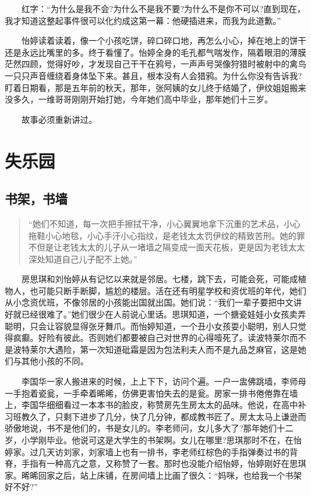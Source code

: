 \documentclass[12pt,UTF8]{ctexbook}
\begin{document}
　　红字：\enquote{为什么是我不会?为什么不是我不要?为什么不是你不可以?直到现在，我才知道这整起事件很可以化约成这第一幕：他硬插进来，而我为此道歉。}

　　怡婷读着读着，像一个小孩吃饼，碎口碎口地，再怎么小心，掉在地上的饼干还是永远比嘴里的多。终于看懂了。怡婷全身的毛孔都气喘发作，隔着眼泪的薄膜茫然四顾，觉得好吵，才发现自己干干在鸦号，一声声号哭像狩猎时被射中的禽鸟一只只声音缠绕着身体坠下来。甚且，根本没有人会猎鸦。为什么你没有告诉我?盯着日期看，那是五年前的秋天，那年，张阿姨的女儿终于结婚了，伊纹姐姐搬来没多久，一维哥哥刚刚开始打她，今年她们高中毕业，那年她们十三岁。

　　故事必须重新讲过。

\hypertarget{shileyuan}{%
\chapter{失乐园}\label{shileyuan}}

\hypertarget{ux4e66ux67b6ux4e66ux5899}{%
\section*{书架，书墙}\label{ux4e66ux67b6ux4e66ux5899}}

\begin{quote}
\enquote{她们不知道，每一次把手擦拭干净，小心翼翼地拿下沉重的艺术品，小心拖鞋小心地毯，小心手汗小心指纹，是老钱太太罚伊纹的精致苦刑。她的罪不但是让老钱太太的儿子从一堵墙之隔变成一面天花板，更是因为老钱太太深处知道自己儿子配不上她。}
\end{quote}

　　房思琪和刘怡婷从有记忆以来就是邻居。七楼，跳下去，可能会死，可能成植物人，也可能只断手断脚，尴尬的楼层。活在还有明星学校和资优班的年代，她们从小念资优班，不像邻居的小孩能出国就出国。她们说：\enquote{我们一辈子要把中文讲好就已经很难了。}她们很少在人前说心里话。思琪知道，一个搪瓷娃娃小女孩卖弄聪明，只会让容貌显得张牙舞爪。而怡婷知道，一个丑小女孩耍小聪明，别人只觉得疯癫。好险有彼此。否则她们都要被自己对世界的心得噎死了。读波特莱尔而不是波特莱尔大遇险，第一次知道砒霜是因为包法利夫人而不是九品芝麻官，这是她们与其他小孩的不同。

　　李国华一家人搬进来的时候，上上下下，访问个遍。一户一盅佛跳墙，李师母一手抱着瓷瓮，一手牵着晞晞，仿佛更害怕失去的是瓮。房家一排书倦倦靠在墙上，李国华细细看过一本本书的脸皮，称赞房先生房太太的品味。他说，在高中补习班教久了，只剩下进步了几分，快了几分钟，都成教书匠了。房太太马上谦逊而骄傲地说，书不是他们的，书是女儿的。李老师问，女儿多大了?那年她们十二岁，小学刚毕业。他说可这是大学生的书架啊。女儿在哪里?思琪那时不在，在怡婷家。过几天访刘家，刘家墙上也有一排书，李老师红棕色的手指弹奏过书的背脊，手指有一种高亢之意，又称赞了一套。那时也没能介绍怡婷，怡婷刚好在思琪家。晞晞回家之后，站上床铺，在房间墙上比画了很久：\enquote{妈咪，也给我一个书架好不好?}
\end{document}
